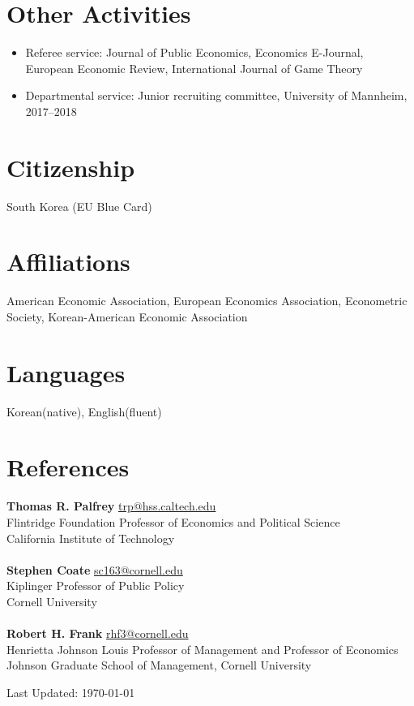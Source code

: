 \documentclass[margin, letterpaper]{res}
\begin{document}
\begin{resume}
\section{Other Activities}
\begin{itemize}
\item Referee service: Journal of Public Economics, Economics E-Journal, European Economic Review, International Journal of Game Theory
\item Departmental service: Junior recruiting committee, University of Mannheim, 2017--2018
\end{itemize}

\section{Citizenship} South Korea (EU Blue Card)%

\section{Affiliations} American Economic Association, European Economics Association, Econometric Society, Korean-American Economic Association

\section{Languages} Korean(native), English(fluent)

\section{References} \textbf{Thomas R. Palfrey} \href{mailto:trp@hss.caltech.edu}{trp@hss.caltech.edu}\\
Flintridge Foundation Professor of Economics and Political Science\\
California Institute of Technology\\\\
\textbf{Stephen Coate} \href{mailto:sc163@cornell.edu}{sc163@cornell.edu}\\
Kiplinger Professor of Public Policy\\
Cornell University\\\\
\textbf{Robert H. Frank} \href{mailto:rhf3@cornell.edu}{rhf3@cornell.edu}\\
Henrietta Johnson Louis Professor of Management and Professor of Economics\\
Johnson Graduate School of Management, Cornell University
\begin{flushright}
Last Updated: \today
\end{flushright}
\end{resume} 
\end{document}
